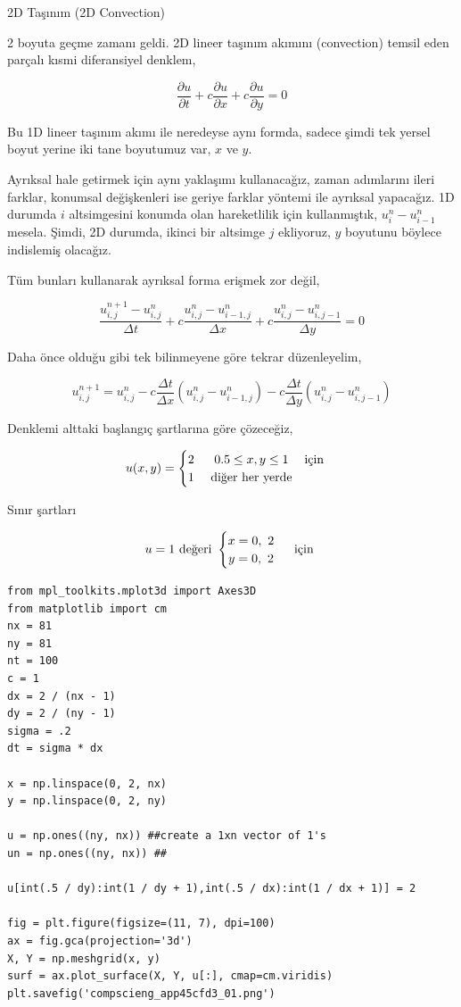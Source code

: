 \documentclass[12pt,fleqn]{article}\usepackage{../../common}
\begin{document}
2D Taşınım (2D Convection)

2 boyuta geçme zamanı geldi. 2D lineer taşınım akımını (convection) temsil eden
parçalı kısmi diferansiyel denklem,

$$
\frac{\partial u}{\partial t} +
c\frac{\partial u}{\partial x} +
c\frac{\partial  u}{\partial y} = 0
$$

Bu 1D lineer taşınım akımı ile neredeyse aynı formda, sadece şimdi tek yersel
boyut yerine iki tane boyutumuz var, $x$ ve $y$.

Ayrıksal hale getirmek için aynı yaklaşımı kullanacağız, zaman adımlarını ileri
farklar, konumsal değişkenleri ise geriye farklar yöntemi ile ayrıksal
yapacağız. 1D durumda $i$ altsimgesini konumda olan hareketlilik için
kullanmıştık,  $u_{i}^n-u_{i-1}^n$ mesela. Şimdi, 2D durumda, ikinci bir
altsimge $j$ ekliyoruz, $y$ boyutunu böylece indislemiş olacağız.

Tüm bunları kullanarak ayrıksal forma erişmek zor değil,

$$
\frac{u_{i,j}^{n+1}-u_{i,j}^n}{\Delta t} +
c\frac{u_{i, j}^n-u_{i-1,j}^n}{\Delta x} +
c\frac{u_{i,j}^n-u_{i,j-1}^n}{\Delta y}=0
$$

Daha önce olduğu gibi tek bilinmeyene göre tekrar düzenleyelim,

$$
u_{i,j}^{n+1} =
u_{i,j}^n-c \frac{\Delta t}{\Delta x}(u_{i,j}^n-u_{i-1,j}^n) -
c \frac{\Delta t}{\Delta y}(u_{i,j}^n-u_{i,j-1}^n)
$$

Denklemi alttaki başlangıç şartlarına göre çözeceğiz,

$$
u(x,y) = \begin{cases}
\begin{matrix}
2\ & 0.5 \leq x, y \leq 1   & \text{için}  \cr
1\ & \text{diğer her yerde}
\end{matrix}\end{cases}
$$

Sınır şartları

$$
u = 1\ \text{değeri } \begin{cases}
\begin{matrix}
x =  0,\ 2 \cr
y =  0,\ 2 \end{matrix}\end{cases}
\text{ için }
$$

\begin{verbatim}
from mpl_toolkits.mplot3d import Axes3D    
from matplotlib import cm
nx = 81
ny = 81
nt = 100
c = 1
dx = 2 / (nx - 1)
dy = 2 / (ny - 1)
sigma = .2
dt = sigma * dx

x = np.linspace(0, 2, nx)
y = np.linspace(0, 2, ny)

u = np.ones((ny, nx)) ##create a 1xn vector of 1's
un = np.ones((ny, nx)) ##

u[int(.5 / dy):int(1 / dy + 1),int(.5 / dx):int(1 / dx + 1)] = 2 

fig = plt.figure(figsize=(11, 7), dpi=100)
ax = fig.gca(projection='3d')                      
X, Y = np.meshgrid(x, y)                            
surf = ax.plot_surface(X, Y, u[:], cmap=cm.viridis)
plt.savefig('compscieng_app45cfd3_01.png')
\end{verbatim}
\end{document}
